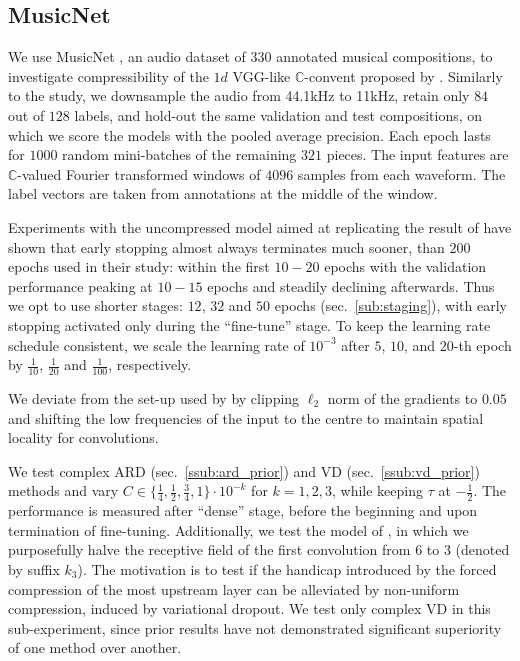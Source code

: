 \documentclass[a4paper,10pt,twocolumn]{article}
\newcommand{\cplx}{\mathbb{C}}
\begin{document}


\subsection{MusicNet} %
\label{sub:musicnet}

We use MusicNet \citep{thickstun_learning_2017}, an audio dataset of $330$ annotated
musical compositions, to investigate compressibility of the $1d$ VGG-like $\cplx$-convent
proposed by \citet{trabelsi_deep_2018}. Similarly to the study, we downsample the audio
from 44.1kHz to 11kHz, retain only $84$ out of $128$ labels, and hold-out the same validation
and test compositions, on which we score the models with the pooled average precision.
Each epoch lasts for $1000$ random mini-batches of the remaining $321$ pieces. The input
features are $\cplx$-valued Fourier transformed windows of $4096$ samples from each waveform.
The label vectors are taken from annotations at the middle of the window.

Experiments with the uncompressed model aimed at replicating the result of \citet{trabelsi_deep_2018}
have shown that early stopping almost always terminates much sooner, than $200$ epochs used
in their study: within the first $10-20$ epochs with the validation performance peaking at
$10-15$ epochs and steadily declining afterwards.
%
Thus we opt to use shorter stages: $12$, $32$ and $50$ epochs (sec.~\ref{sub:staging}), with
early stopping activated only during the ``fine-tune'' stage. To keep the learning rate schedule
consistent, we scale the learning rate of $10^{-3}$ after $5$, $10$, and $20$-th epoch by
$\tfrac1{10}$, $\tfrac1{20}$ and $\tfrac1{100}$, respectively.

We deviate from the set-up used by \citet{trabelsi_deep_2018} by clipping $\ell_2$ norm of the
gradients to $0.05$ and shifting the low frequencies of the input to the centre to maintain
spatial locality for convolutions.

We test complex ARD (sec.~\ref{ssub:ard_prior}) and VD (sec.~\ref{ssub:vd_prior}) methods
and vary $
  C \in \{\tfrac14, \tfrac12, \tfrac34, 1\} \cdot 10^{-k}
$ for $k=1, 2, 3$, while keeping $\tau$ at $-\tfrac12$. The performance is measured after
``dense'' stage, before the beginning and upon termination of fine-tuning.
%
Additionally, we test the model of \citet{trabelsi_deep_2018}, in which we purposefully
halve the receptive field of the first convolution from $6$ to $3$ (denoted by suffix $k_3$).
The motivation is to test if the handicap introduced by the forced compression of the most
upstream layer can be alleviated by non-uniform compression, induced by variational dropout.
We test only complex VD in this sub-experiment, since prior results have not demonstrated
significant superiority of one method over another.  %
\end{document}
